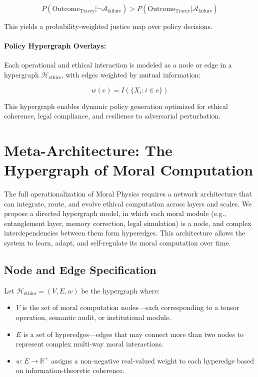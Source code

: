 \documentclass{article}
\theoremstyle{plain}
\theoremstyle{claimstyle}
\begin{document}
\[
P(\text{Outcome}_{\text{Tracey}} | \neg \mathcal{A}_\text{failure}) > P(\text{Outcome}_{\text{Tracey}} | \mathcal{A}_\text{failure})
\]

This yields a probability-weighted justice map over policy decisions.

\paragraph{Policy Hypergraph Overlays:}

Each operational and ethical interaction is modeled as a node or edge in a hypergraph \(\mathcal{H}_{\text{ethics}}\), with edges weighted by mutual information:

\[
w(e) = I(\{X_i: i \in e\})
\]

This hypergraph enables dynamic policy generation optimized for ethical coherence, legal compliance, and resilience to adversarial perturbation.

\section{Meta-Architecture: The Hypergraph of Moral Computation}

The full operationalization of Moral Physics requires a network architecture that can integrate, route, and evolve ethical computation across layers and scales. We propose a directed hypergraph model, in which each moral module (e.g., entanglement layer, memory correction, legal simulation) is a node, and complex interdependencies between them form hyperedges. This architecture allows the system to learn, adapt, and self-regulate its moral computation over time.

\subsection{Node and Edge Specification}

Let \(\mathcal{H}_{\text{ethics}} = (V, E, w)\) be the hypergraph where:

\begin{itemize}
    \item \(V\) is the set of moral computation nodes—each corresponding to a tensor operation, semantic audit, or institutional module.
    \item \(E\) is a set of hyperedges—edges that may connect more than two nodes to represent complex multi-way moral interactions.
    \item \(w: E \rightarrow \mathbb{R}^+\) assigns a non-negative real-valued weight to each hyperedge based on information-theoretic coherence.
\end{itemize}
\end{document}
